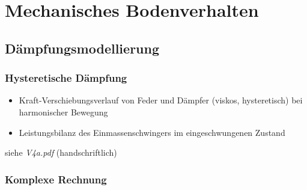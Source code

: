\documentclass[hyperref={pdfpagemode=FullScreen, colorlinks=false}]{beamer}
\begin{document}
\maketitle

\section{Mechanisches Bodenverhalten}
\subsection{Dämpfungsmodellierung}

\begin{frame}
\frametitle{Hysteretische Dämpfung}
\begin{itemize}
 \item Kraft-Verschiebungsverlauf von Feder und Dämpfer (viskos, hysteretisch) bei harmonischer Bewegung
 \item Leistungsbilanz des Einmassenschwingers im eingeschwungenen Zustand
\end{itemize}
\vfill

\hfill siehe \textsl{V4a.pdf} (handschriftlich)
\end{frame}

\subsubsection{Komplexe Rechnung}
\end{document}
